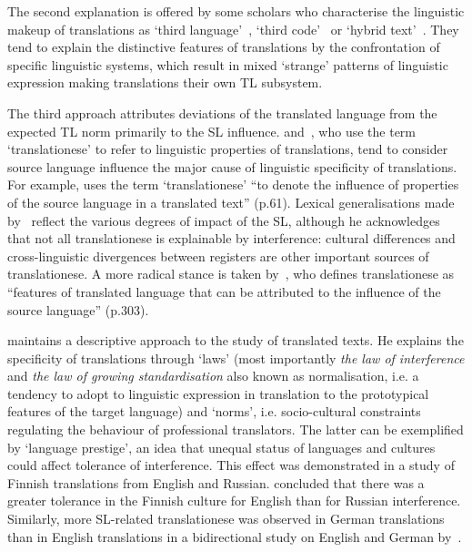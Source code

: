 The second explanation is offered by some scholars who characterise the linguistic makeup of translations as `third language'~\cite{Duff1981}, `third code'~\cite{Frawley1984} or `hybrid text'~\cite{Schaffner2001a,Schaffner2001b}. They tend to explain the distinctive features of translations by the confrontation of specific linguistic systems, which result in mixed `strange' patterns of linguistic expression making translations their own TL subsystem. 

The third approach attributes deviations of the translated language from the expected TL norm primarily to the SL influence. \citet{Gellerstam1986} and~\citet{Santos1995}, who use the term `translationese' to refer to linguistic properties of translations, tend to consider source language influence the major cause of linguistic specificity of translations. For example, \citet{Santos1995} uses the term `translationese' ``to denote the influence of properties of the source language in a translated text'' (p.61). Lexical generalisations made by~\citet{Gellerstam1986} reflect the various degrees of impact of the SL, although he acknowledges that not all translationese is explainable by interference: cultural differences and cross-linguistic divergences between registers are other important sources of translationese. A more radical stance is taken by~\citet{Rabadan2009}, who defines translationese as ``features of translated language that can be attributed to the influence of the source language'' (p.303).

\citet{Toury1995} maintains a descriptive approach to the study of translated texts. He explains the specificity of translations through `laws' (most importantly \textit{the law of interference} and \textit{the law of growing standardisation} also known as normalisation, i.e. a tendency to adopt to linguistic expression in translation to the prototypical features of the target language) and `norms', i.e. socio-cultural constraints regulating the behaviour of professional translators. The latter can be exemplified by `language prestige', an idea that unequal status of languages and cultures could affect tolerance of interference. This effect was demonstrated in a study of Finnish translations from English and Russian. \citet[p.72]{Mauranen2004} concluded that there was a greater tolerance in the Finnish culture for English than for Russian interference. Similarly, more SL-related translationese was observed in German translations than in English translations in a bidirectional study on English and German by~\citet{Evert2017}. 


